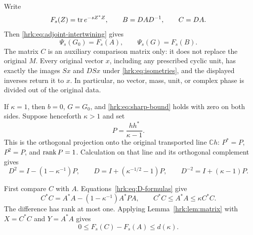 \documentclass[11pt]{article}
\begin{document}
Write
\[
 F_s(Z)=\operatorname{tr} e^{-sZ^*Z},\qquad B=DAD^{-1},\qquad C=DA.
\]
Then \eqref{hrk:eq:adjoint-intertwining} gives
\begin{equation}\label{hrk:eq:trace-identities}
 \Psi_s(G_0)=F_s(A),\qquad \Psi_s(G)=F_s(B).
\end{equation}
The matrix $C$ is an auxiliary comparison matrix only: it does not
replace the original $M$. Every original vector $x$, including any
prescribed cyclic unit, has exactly the images $Sx$ and $DSx$ under
\eqref{hrk:eq:isometries}, and the displayed inverses return it to $x$.
In particular, no vector, mass, unit, or complex phase is divided
out of the original data.

If $\kappa=1$, then $b=0$, $G=G_0$, and \eqref{hrk:eq:sharp-bound}
holds with zero on both sides. Suppose henceforth $\kappa>1$ and set
\begin{equation}\label{hrk:eq:rankone-projector}
 P=\frac{hh^*}{\kappa-1}.
\end{equation}
This is the orthogonal projection onto the original transported
line $\mathbb Ch$: $P^*=P$, $P^2=P$, and $\operatorname{rank} P=1$.
Calculation on that line and its orthogonal complement gives
\begin{equation}\label{hrk:eq:D-formulas}
 D^2=I-(1-\kappa^{-1})P,\qquad
 D=I+(\kappa^{-1/2}-1)P,\qquad
 D^{-2}=I+(\kappa-1)P.
\end{equation}

First compare $C$ with $A$. Equations~\eqref{hrk:eq:D-formulas} give
\begin{equation}\label{hrk:eq:left-comparison}
 C^*C=A^*A-(1-\kappa^{-1})A^*PA,
 \qquad C^*C\leq A^*A\leq\kappa C^*C.
\end{equation}
The difference has rank at most one. Applying
Lemma~\ref{hrk:lem:matrix} with $X=C^*C$ and $Y=A^*A$ gives
\begin{equation}\label{hrk:eq:first-gap}
 0\leq F_s(C)-F_s(A)\leq d(\kappa).
\end{equation}
\end{document}
